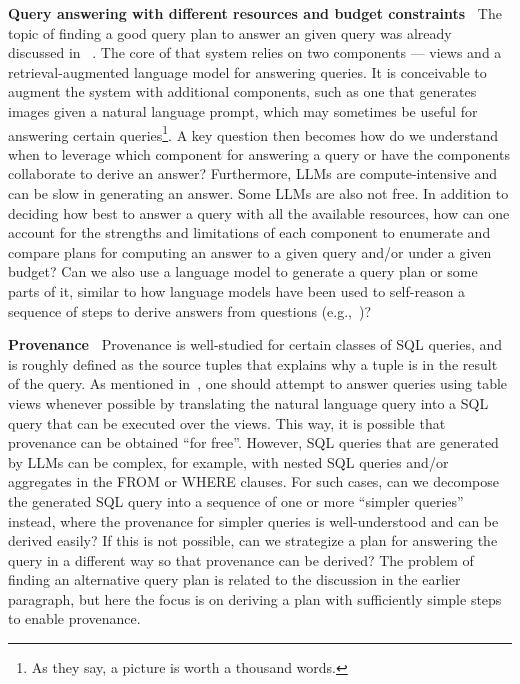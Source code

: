 \documentclass[11pt,dvipdfm]{article}
\begin{document}
\smallskip
\noindent
{\bf Query answering with different resources and budget constraints~} The topic of finding a good query plan to answer an given query was already discussed in ~\cite{posttext}. The core of that system relies on two components --- views and a retrieval-augmented language model for answering queries. It is conceivable to augment the system with additional components, such as one that generates images given a natural language prompt, which may sometimes be useful for answering certain queries\footnote{As they say, a picture is worth a thousand words.}. 
A key question then becomes how do we understand when to leverage which component for answering a query or have the components collaborate to derive an answer? Furthermore, LLMs are compute-intensive and can be slow in generating an answer. Some LLMs are also not free. In addition to deciding how best to answer a query with all the available resources, how can one account for the strengths and limitations of each component to enumerate and compare plans for computing an answer to a given query and/or under a given budget? Can we also use a language model to generate a query plan or some parts of it, similar to how language models have been used to self-reason a sequence of steps to derive answers from questions (e.g.,~\cite{wei2022chain, yao2023react})?

\smallskip
\noindent
{\bf Provenance~}
Provenance is well-studied for certain classes of SQL queries, and is roughly defined as the source tuples that explains why a tuple is in the result of the query. As mentioned in~\cite{posttext}, one should attempt to answer queries using table views whenever possible by translating the natural language query into a SQL query that can be executed over the views. This way, it is possible that provenance can be obtained ``for free''. However, SQL queries that are generated by LLMs can be complex, for example, with nested SQL queries and/or aggregates in the FROM or WHERE clauses. For such cases, can we decompose the generated SQL query into a sequence of one or more ``simpler queries'' instead, where the provenance for simpler queries is well-understood and can be derived easily? If this is not possible, can we strategize a plan for answering the query in a different way so that provenance can be derived? 
The problem of finding an alternative query plan is related to the discussion in the earlier paragraph, but here the focus is on deriving a plan with sufficiently simple steps to enable provenance.
\end{document}
